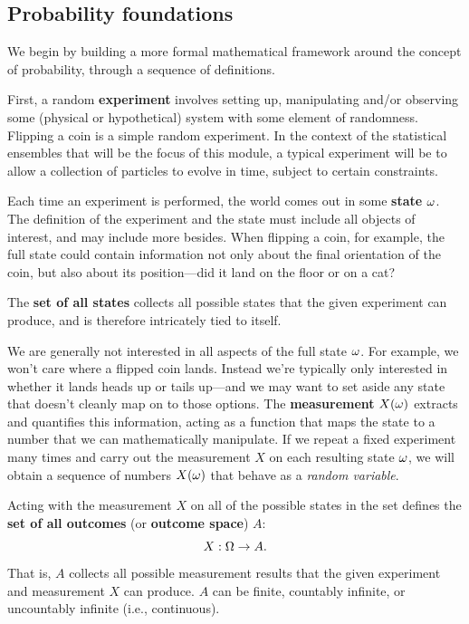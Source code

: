 \subsection{\label{sec:prob}Probability foundations}
We begin by building a more formal mathematical framework around the concept of probability, through a sequence of definitions.

First, a random \textbf{experiment} \cE involves setting up, manipulating and/or observing some (physical or hypothetical) system with some element of randomness.
Flipping a coin is a simple random experiment.
In the context of the statistical ensembles that will be the focus of this module, a typical experiment will be to allow a collection of particles to evolve in time, subject to certain constraints.

Each time an experiment is performed, the world comes out in some \textbf{state} $\omega$.
The definition of the experiment and the state must include all objects of interest, and may include more besides.
When flipping a coin, for example, the full state could contain information not only about the final orientation of the coin, but also about its position---did it land on the floor or on a cat?

The \textbf{set of all states} \Om collects all possible states \om that the given experiment \cE can produce, and is therefore intricately tied to \cE itself.

We are generally not interested in all aspects of the full state $\omega$.
For example, we won't care where a flipped coin lands.
Instead we're typically only interested in whether it lands heads up or tails up---and we may want to set aside any state that doesn't cleanly map on to those options.
The \textbf{measurement} $X(\omega)$ extracts and quantifies this information, acting as a function that maps the state \om to a number that we can mathematically manipulate.
If we repeat a fixed experiment \cE many times and carry out the measurement $X$ on each resulting state $\omega$, we will obtain a sequence of numbers $X(\omega)$ that behave as a \textit{random variable}.

Acting with the measurement $X$ on all of the possible states in the set \Om defines the \textbf{set of all outcomes} (or \textbf{outcome space}) $A$:
\begin{equation*}
  X: \Omega \to A.
\end{equation*}
That is, $A$ collects all possible measurement results that the given experiment \cE and measurement $X$ can produce.
$A$ can be finite, countably infinite, or uncountably infinite (i.e., continuous).

